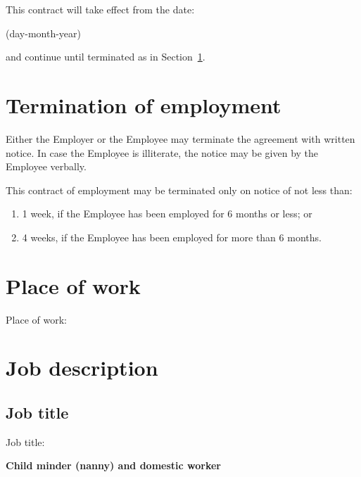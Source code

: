 \documentclass[a4paper,11pt]{article}
\begin{document}
\para This contract will take effect from the date:

\begin{center}

  (day-month-year)
\end{center}

\noindent and continue until terminated as in Section~\ref{termination}.

\section{Termination of employment}
\label{termination}

\para Either the Employer or the Employee may terminate the agreement with
written notice. In case the Employee is illiterate, the notice may be given by
the Employee verbally.

\para This contract of employment may be terminated only on notice of not less
than:

\begin{enumerate}
  \item 1 week, if the Employee has been employed for 6 months or less; or
  \item 4 weeks, if the Employee has been employed for more than 6 months.
\end{enumerate}

\section{Place of work}

\para Place of work:

\begin{center}
\end{center}

\section{Job description}

\subsection{Job title}
\label{job-title}

\para Job title:

\begin{center}
   \textbf{Child minder (nanny) and domestic worker}
\end{center}
\end{document}
